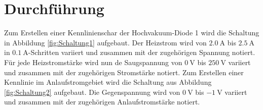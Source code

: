 
\section{Durchführung}
\label{sec:Durchführung}
Zum Erstellen einer Kennlinienschar der Hochvakuum-Diode 1 wird die Schaltung in Abbildung \ref{fig:Schaltung1} aufgebaut. Der Heizstrom wird von $\SI{2.0}{\ampere}$ bis $\SI{2.5}{\ampere}$ in $\SI{0.1}{\ampere}$-Schritten variiert und zusammen mit der zugehörigen Spannung notiert. Für jede Heizstromstärke wird nun de Saugspannung von $\SI{0}{\volt}$ bis $\SI{250}{\volt}$ variiert und zusammen mit der zugehörigen Stromstärke notiert.
Zum Erstellen einer Kennlinie im Anlaufstromgebiet wird die Schaltung aus Abbildung \ref{fig:Schaltung2} aufgebaut. Die Gegenspannung wird von $\SI{0}{\volt}$ bis $\SI{-1}{\volt}$ variiert und zusammen mit der zugehörigen Anlaufstromstärke notiert.

